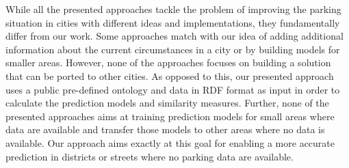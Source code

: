 While all the presented approaches tackle the problem of improving the parking situation in cities with different ideas and implementations, they fundamentally differ from our work. 
Some approaches match with our idea of adding additional information about the current circumstances in a city or by building models for smaller areas.
However, none of the approaches focuses on building a solution that can be ported to other cities. 
As opposed to this, our presented approach uses a public pre-defined ontology and data in RDF format as input in order to calculate the prediction models and similarity measures. 
Further, none of the presented approaches aims at training prediction models for small areas where data are available and transfer those models to other areas where no data is available. Our approach aims exactly at this goal for enabling a more accurate prediction in districts or streets where no parking data are available. 

